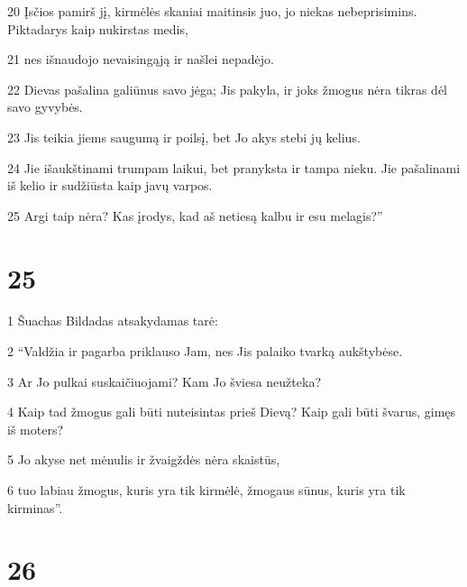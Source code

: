 \par 20 Įsčios pamirš jį, kirmėlės skaniai maitinsis juo, jo niekas nebeprisimins. Piktadarys kaip nukirstas medis, 
\par 21 nes išnaudojo nevaisingąją ir našlei nepadėjo. 
\par 22 Dievas pašalina galiūnus savo jėga; Jis pakyla, ir joks žmogus nėra tikras dėl savo gyvybės. 
\par 23 Jis teikia jiems saugumą ir poilsį, bet Jo akys stebi jų kelius. 
\par 24 Jie išaukštinami trumpam laikui, bet pranyksta ir tampa nieku. Jie pašalinami iš kelio ir sudžiūsta kaip javų varpos. 
\par 25 Argi taip nėra? Kas įrodys, kad aš netiesą kalbu ir esu melagis?”



\chapter{25}


\par 1 Šuachas Bildadas atsakydamas tarė: 
\par 2 “Valdžia ir pagarba priklauso Jam, nes Jis palaiko tvarką aukštybėse. 
\par 3 Ar Jo pulkai suskaičiuojami? Kam Jo šviesa neužteka? 
\par 4 Kaip tad žmogus gali būti nuteisintas prieš Dievą? Kaip gali būti švarus, gimęs iš moters? 
\par 5 Jo akyse net mėnulis ir žvaigždės nėra skaistūs, 
\par 6 tuo labiau žmogus, kuris yra tik kirmėlė, žmogaus sūnus, kuris yra tik kirminas”.



\chapter{26}


